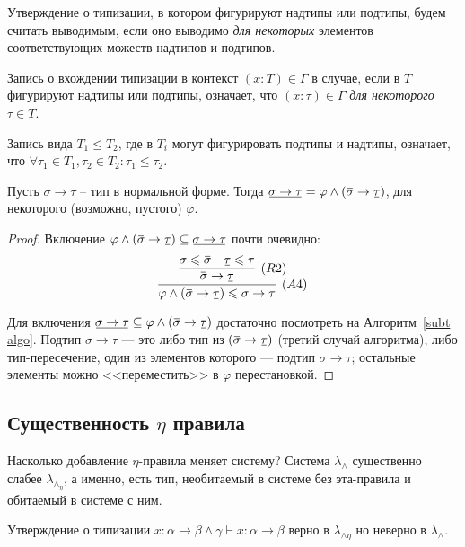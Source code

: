 \documentclass[../main.tex]{subfiles}
\begin{document}
Утверждение о типизации, в котором фигурируют надтипы или подтипы, будем считать выводимым, если оно выводимо {\it для некоторых} элементов соответствующих можеств надтипов и подтипов.

Запись о вхождении типизации в контекст $(x \colon T) \in \Gamma$ в случае, если в $T$ фигурируют надтипы или подтипы, означает, что $(x \colon \tau) \in \Gamma$ {\it для некоторого} $\tau \in T$.

Запись вида $T_1 \leqslant T_2$, где в $T_i$ могут фигурировать подтипы и надтипы, означает, что $\forall \tau_1 \in T_1, \tau_2 \in T_2 : \tau_1 \leqslant \tau_2$.

\begin{lemma} \label{подтип стрелки}
Пусть $\sigma \to \tau$ -- тип в нормальной форме. Тогда
$\ub{\sigma \to \tau} = \varphi \wedge (\ob{\sigma} \to \ub{\tau})$,
для некоторого (возможно, пустого) $\varphi$.

\end{lemma}

\begin{proof}
    Включение $\varphi \wedge (\ob{\sigma} \to \ub{\tau}) \subseteq \ub{\sigma \to \tau}$ почти очевидно: 
    $$\infer[(A4)]{\varphi \wedge (\ob{\sigma} \to \ub{\tau}) \leqslant \sigma \to \tau}
                  {\infer[(R2)]{\ob{\sigma} \to \ub{\tau}}
                               {\sigma \leqslant \ob{\sigma} & \ub{\tau} \leqslant \tau}}$$
                               
    Для включения $\ub{\sigma \to \tau} \subseteq \varphi \wedge (\ob{\sigma} \to \ub{\tau})$ достаточно посмотреть на Алгоритм~\ref{subt algo}. Подтип $\sigma \to \tau$ --- это либо тип из $(\ob{\sigma} \to \ub{\tau})$ (третий случай алгоритма), либо тип-пересечение, один из элементов которого --- подтип $\sigma \to \tau$; остальные элементы можно <<переместить>> в $\varphi$ перестановкой.
\end{proof}


\subsection{Существенность $\eta$ правила}

Насколько добавление $\eta$-правила меняет систему? 
Система $\lambda_\wedge$ существенно слабее $\lambda_\wedge_\eta$, а именно, есть тип, необитаемый в системе без эта-правила и обитаемый в системе с ним. 

\begin{lemma} \label{существенность: типизация}
Утверждение о типизации $x : \alpha \to \beta \wedge \gamma \vdash x : \alpha \to \beta$ верно в $\lambda_{\wedge \eta}$ но неверно в $\lambda_{\wedge}$.
\end{lemma}
\end{document}
